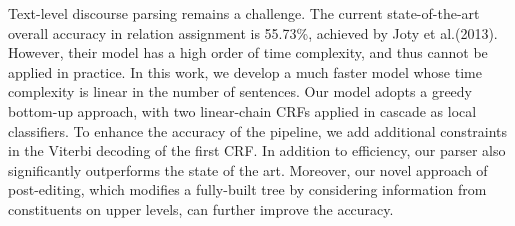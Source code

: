 Text-level discourse parsing remains a challenge. The current state-of-the-art overall accuracy in relation assignment is 55.73\%, achieved by Joty et al.(2013). However, their model has a high order of time complexity, and thus cannot be applied in practice. In this work, we develop a much faster model whose time complexity is linear in the number of sentences. Our model adopts a greedy bottom-up approach, with two linear-chain CRFs applied in cascade as local classifiers. To enhance the accuracy of the pipeline, we add additional constraints in the Viterbi decoding of the first CRF. In addition to efficiency, our parser also significantly outperforms the state of the art. Moreover, our novel approach of post-editing, which modifies a fully-built tree by considering information from constituents on upper levels, can further improve the accuracy.
